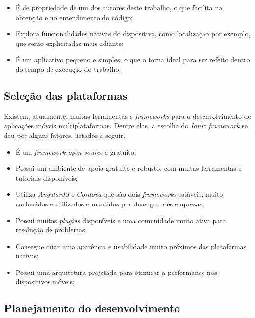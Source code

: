 \begin{itemize}
    \item É de propriedade de um dos autores deste trabalho, o que facilita na obtenção e no entendimento do código;
    \item Explora funcionalidades nativas do dispositivo, como localização por exemplo, que serão explicitadas mais adiante;
    \item É um aplicativo pequeno e simples, o que o torna ideal para ser refeito dentro do tempo de execução do trabalho;
\end{itemize}

\subsection{Seleção das plataformas} \label{subsection:selecaodasplataformas}

Existem, atualmente, muitas ferramentas e \textit{frameworks} para o desenvolvimento de aplicações móveis multiplataformas. Dentre elas, a escolha do \textit{Ionic framework} se deu por alguns fatores, listados a seguir. 

\begin{itemize}
    \item É um \textit{framework open source} e gratuito;
    \item Possui um ambiente de apoio gratuito e robusto, com muitas ferramentas e tutoriais disponíveis;
    \item Utiliza \textit{AngularJS} e \textit{Cordova} que são dois \textit{frameworks} estáveis, muito conhecidos e utilizados e mantidos por duas grandes empresas;
    \item Possui muitos \textit{plugins} disponíveis e uma comunidade muito ativa para resolução de problemas; %
    \item Consegue criar uma aparência e usabilidade muito próximos das plataformas nativas; %
    \item Possui uma arquitetura projetada para otimizar a performance nos dispositivos móveis; 
\end{itemize}
 
\subsection{Planejamento do desenvolvimento} \label{subsection:planejamentodesenvolvimento}

